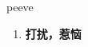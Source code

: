 
\begin{frame}
{\huge peeve}
\begin{center}
\begin{enumerate}\Large
  \item \textbf{打扰，惹恼}
\end{enumerate}
\end{center}
\end{frame}
